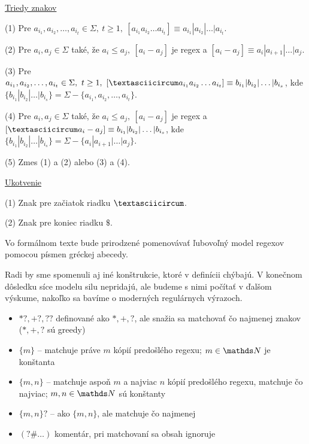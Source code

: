 \underline{Triedy znakov}
\begin{list}{}{}
\item[(1)] Pre $a_{i_1},a_{i_2},\dots ,a_{i_t} \in \Sigma,~t \geq 1,~\left[ a_{i_1}a_{i_2}\dots a_{i_t} \right] \equiv a_{i_1}|a_{i_2}|\dots |a_{i_t} $.
\item[(2)] Pre $a_i,a_j \in \Sigma$ také, že $a_i\leq a_j,~ [a_i-a_j]$ je regex a $[a_i-a_j]\equiv a_i|a_{i+1}|\dots |a_j$.
\item[(3)] Pre $a_{i_1},a_{i_2},\dots ,a_{i_t} \in \Sigma,~t \geq 1,~\left[ \textasciicircum a_{i_1}a_{i_2}\dots a_{i_t} \right] \equiv b_{i_1}|b_{i_2}|\dots |b_{i_s} $, kde $\lbrace b_{i_1}|b_{i_2}|\dots |b_{i_s}\rbrace = \Sigma - \lbrace a_{i_1},a_{i_2},\dots ,a_{i_t} \rbrace$.
\item[(4)] Pre $a_i,a_j \in \Sigma$ také, že $a_i\leq a_j,~ [a_i-a_j]$ je regex a $[\textasciicircum a_i-a_j]\equiv b_{i_1}|b_{i_2}|\dots |b_{i_s}$, kde $\lbrace b_{i_1}|b_{i_2}|\dots |b_{i_s}\rbrace = \Sigma - \lbrace a_i|a_{i+1}|\dots |a_j \rbrace$.
\item[(5)] Zmes (1) a (2) alebo (3) a (4).
\end{list}

\underline{Ukotvenie}
\begin{list}{}{}
\item[(1)] Znak pre začiatok riadku $ \textasciicircum $.
\item[(2)] Znak pre koniec riadku $ \mathdollar $.
\end{list}

Vo formálnom texte bude prirodzené pomenovávať ľubovoľný model regexov pomocou písmen gréckej abecedy.

Radi by sme spomenuli aj iné konštrukcie, ktoré v definícii chýbajú. V konečnom dôsledku síce modelu silu nepridajú, ale budeme s nimi počítať v ďalšom výskume, nakoľko sa bavíme o moderných regulárnych výrazoch.

\begin{itemize}
\item $*?,+?,??$ definované ako $*,+,?$, ale snažia sa matchovať čo najmenej znakov ($*,+,?$ sú greedy)
\item $\lbrace m \rbrace$ -- matchuje práve $m$ kópií predošlého regexu; $m \in \N$ je konštanta
\item $ \lbrace m,n \rbrace$ -- matchuje aspoň $m$ a najviac $n$ kópií predošlého regexu, matchuje čo najviac; $m, n \in \N$ sú konštanty
\item $ \lbrace m,n \rbrace ?$ -- ako $ \lbrace m,n \rbrace$, ale matchuje čo najmenej
\item $(?\#\dots )$ komentár, pri matchovaní sa obsah ignoruje
\end{itemize}

